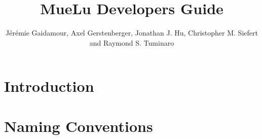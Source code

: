 \documentclass{article}
\title{MueLu Developers Guide}
\author{J\'er\'emie Gaidamour, Axel Gerstenberger, Jonathan J. Hu,
        Christopher M. Siefert and  Raymond S. Tuminaro}
\begin{document}

\maketitle

\begin{abstract}

\end{abstract}

\pagestyle{myheadings} \thispagestyle{plain} 

\section{Introduction}\label{sec:introduction}


\section{Naming Conventions}\label{sec:name conventions}



 
\end{document}

